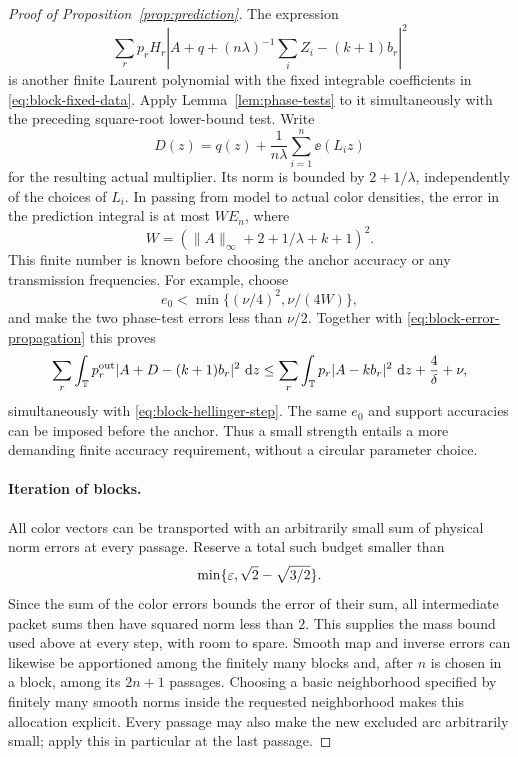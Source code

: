 \begin{proof}[Proof of Proposition~\ref{prop:prediction}]
The expression
\[
 \sum_r p_rH_r|A+q+(n\lambda)^{-1}\textstyle\sum_iZ_i-(k+1)b_r|^2
\]
is another finite Laurent polynomial with the fixed integrable
coefficients in \eqref{eq:block-fixed-data}.  Apply
Lemma~\ref{lem:phase-tests} to it simultaneously with the preceding
square-root lower-bound test.  Write
\begin{equation}
 D(z)=q(z)+\frac1{n\lambda}\sum_{i=1}^n\ee(L_i z)
 \label{eq:block-diagonal-estimator}
\end{equation}
for the resulting actual multiplier.  Its norm is bounded by
$2+1/\lambda$, independently of the choices of $L_i$.  In passing
from model to actual color densities, the error in the prediction
integral is at most $W E_n$, where
\begin{equation}
 W=(\|A\|_\infty+2+1/\lambda+k+1)^2.
 \label{eq:block-estimator-error-weight}
\end{equation}
This finite number is known before choosing the anchor accuracy or
any transmission frequencies.  For example, choose
\[
 e_0<\min\{(\nu/4)^2,\nu/(4W)\},
\]
and make the two phase-test errors less than $\nu/2$.
Together with \eqref{eq:block-error-propagation} this proves
\begin{equation}
 \sum_r\int_\mathbb T p_r^{\rm out}|A+D-(k+1)b_r|^2\,\,\mathrm d z
 \le\sum_r\int_\mathbb T p_r|A-kb_r|^2\,\,\mathrm d z
            +\frac4\delta+\nu,
 \label{eq:block-prediction-step}
\end{equation}
simultaneously with \eqref{eq:block-hellinger-step}.
The same $e_0$ and support accuracies can be imposed before the
anchor.  Thus a small strength entails a more demanding finite
accuracy requirement, without a circular parameter choice.

\paragraph{Iteration of blocks.}
All color vectors can be transported with an arbitrarily small sum
of physical norm errors at every passage.  Reserve a total such
budget smaller than
\[
 \min\{\varepsilon,\sqrt2-\sqrt{3/2}\}.
\]
Since the sum of the color errors bounds the error of their sum,
all intermediate packet sums then have squared norm less than $2$.
This supplies the mass bound used above at every step, with room to
spare.  Smooth map and inverse errors can likewise be apportioned
among the finitely many blocks and, after $n$ is chosen in a block,
among its $2n+1$ passages.  Choosing a basic neighborhood specified
by finitely many smooth norms inside the requested neighborhood
makes this allocation explicit.  Every passage may also make the
new excluded arc arbitrarily small; apply this in particular at the
last passage.


\end{proof}
